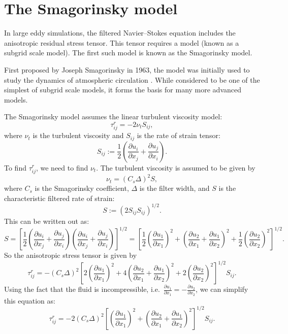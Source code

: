 \documentclass[11pt,a4paper]{article}
\begin{document}
\section{The Smagorinsky model}
In large eddy simulations, the filtered Navier--Stokes equation includes the anisotropic residual stress tensor. This tensor requires a model (known as a subgrid scale model). The first such model is known as the Smagorinsky model.

First proposed by Joseph Smagorinsky in 1963, the model was initially used to study the dynamics of atmospheric circulation \cite{Smagorinsky1963}. While considered to be one of the simplest of subgrid scale models, it forms the basis for many more advanced  models. 

The Smagorinsky model assumes the linear turbulent viscosity model:
$$\tau_{ij}^r = -2\nu_t {S}_{ij},$$
where $\nu_t$ is the turbulent viscosity and $S_{ij}$ is the rate of strain tensor:
$${S}_{ij} := \frac{1}{2}\left( \frac{\partial {u}_i}{\partial x_j} + \frac{\partial {u}_j}{\partial x_i}\right).$$
To find $\tau_{ij}^r$, we need to find $\nu_t$. The turbulent viscosity is assumed to be given by
\begin{equation}\label{smag_nut}
\nu_t = (C_s \Delta)^2 {S},
\end{equation}
where $C_s$ is the Smagorinsky coefficient, $\Delta$ is the filter width, and ${S}$ is the characteristic filtered rate of strain:
$${S} := \left(2{S}_{ij}{S}_{ij}\right)^{1/2}.$$
This can be written out as:
$${S} = \left[\frac{1}{2}\left( \frac{\partial {u}_i}{\partial x_j} + \frac{\partial {u}_j}{\partial x_i}\right)\left( \frac{\partial {u}_i}{\partial x_j} + \frac{\partial {u}_j}{\partial x_i}\right)\right]^{1/2} = \left[\frac{1}{2}\left( \frac{\partial {u}_1}{\partial x_1}\right)^2+\left( \frac{\partial {u}_2}{\partial x_1} + \frac{\partial {u}_1}{\partial x_2}\right)^2+\frac{1}{2}\left( \frac{\partial {u}_2}{\partial x_2}\right)^2 \right]^{1/2}.$$
So the anisotropic stress tensor is given by
\begin{equation}
\tau_{ij}^r = -(C_s \Delta)^2\left[2\left( \frac{\partial {u}_1}{\partial x_1}\right)^2+4\left( \frac{\partial {u}_2}{\partial x_1} + \frac{\partial {u}_1}{\partial x_2}\right)^2+2\left( \frac{\partial {u}_2}{\partial x_2}\right)^2 \right]^{1/2}{S}_{ij}.
\end{equation}
Using the fact that the fluid is incompressible, i.e.\ $\displaystyle \frac{\partial {u}_1}{\partial x_1} = -\frac{\partial {u}_2}{\partial x_2}$, we can simplify this equation as:
\begin{equation}\label{smagTau}
\tau_{ij}^r = -2(C_s \Delta)^2\left[\left( \frac{\partial {u}_1}{\partial x_1}\right)^2+\left( \frac{\partial {u}_2}{\partial x_1} + \frac{\partial {u}_1}{\partial x_2}\right)^2 \right]^{1/2}{S}_{ij}.
\end{equation}
\end{document}

